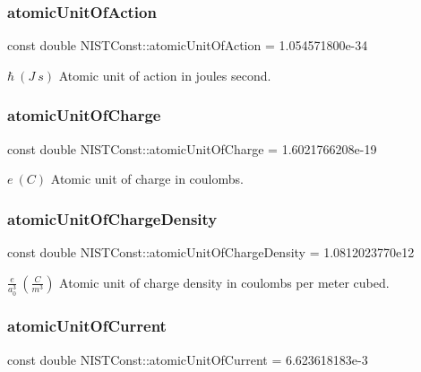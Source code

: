 \subsubsection{\texorpdfstring{atomic\+Unit\+Of\+Action}{atomicUnitOfAction}}
{\footnotesize\ttfamily const double N\+I\+S\+T\+Const\+::atomic\+Unit\+Of\+Action = 1.\+054571800e-\/34}

$\hbar \ (J\ s)$ Atomic unit of action in joules second. \mbox{\label{group___atomic_unit_ga1a42bd5db581dc5bf7a87b864bc77cf4}} 
\subsubsection{\texorpdfstring{atomic\+Unit\+Of\+Charge}{atomicUnitOfCharge}}
{\footnotesize\ttfamily const double N\+I\+S\+T\+Const\+::atomic\+Unit\+Of\+Charge = 1.\+6021766208e-\/19}

$e \ (C)$ Atomic unit of charge in coulombs. \mbox{\label{group___atomic_unit_gaa1918065ee8731837afe6bddee194320}} 
\subsubsection{\texorpdfstring{atomic\+Unit\+Of\+Charge\+Density}{atomicUnitOfChargeDensity}}
{\footnotesize\ttfamily const double N\+I\+S\+T\+Const\+::atomic\+Unit\+Of\+Charge\+Density = 1.\+0812023770e12}

$\frac{e}{a_0^3} \ (\frac{C}{m^3})$ Atomic unit of charge density in coulombs per meter cubed. \mbox{\label{group___atomic_unit_ga6d0f3cfc8aaa2aeb120559aaea2dc5c6}} 
\subsubsection{\texorpdfstring{atomic\+Unit\+Of\+Current}{atomicUnitOfCurrent}}
{\footnotesize\ttfamily const double N\+I\+S\+T\+Const\+::atomic\+Unit\+Of\+Current = 6.\+623618183e-\/3}

